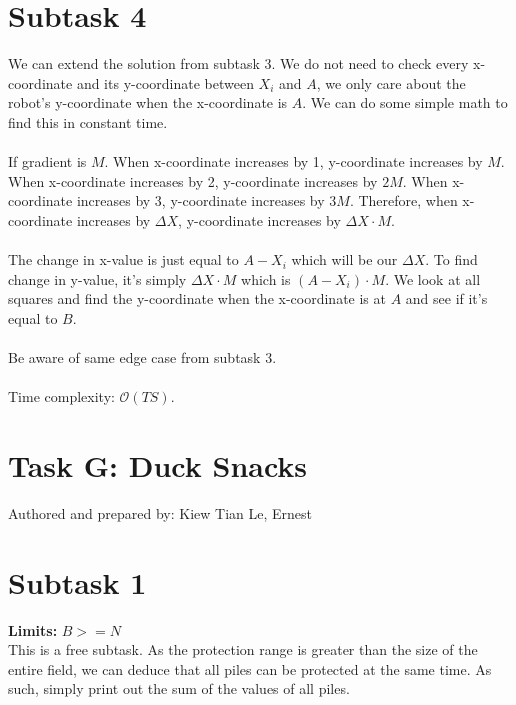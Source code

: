 \documentclass{report}
\begin{document}
\pagebreak
\hfill \break \hfill \break

\section*{Subtask 4}
We can extend the solution from subtask 3. We do not need to check every x-coordinate and its y-coordinate between $X_i$ and $A$, we only care about the robot's y-coordinate when the x-coordinate is $A$. We can do some simple math to find this in constant time.
\\\\
If gradient is $M$. When x-coordinate increases by 1, y-coordinate increases by $M$. When x-coordinate increases by 2, y-coordinate increases by $2M$. When x-coordinate increases by 3, y-coordinate increases by $3M$. Therefore, when x-coordinate increases by $\Delta X$, y-coordinate increases by $\Delta X \cdot M$.
\\\\
The change in x-value is just equal to $A - X_i$ which will be our $\Delta X$. To find change in y-value, it's simply $\Delta X \cdot M$ which is $(A - X_i) \cdot M$. We look at all squares and find the y-coordinate when the x-coordinate is at $A$ and see if it's equal to $B$.
\\\\
Be aware of same edge case from subtask 3.
\\\\
Time complexity: $\mathcal{O}(TS)$.

\pagebreak

\section*{Task G: Duck Snacks}
Authored and prepared by: Kiew Tian Le, Ernest
\section*{Subtask 1}
\textbf{Limits: } $B >= N$\\
This is a free subtask. As the protection range is greater than the size of the entire field, we can deduce that all piles can be protected at the same time. As such, simply print out the sum of the values of all piles. 
\end{document}
